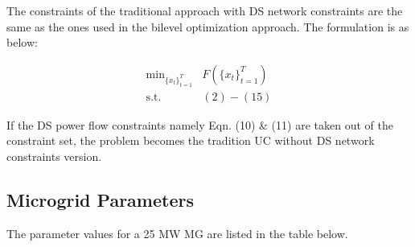 The constraints of the traditional approach with DS network constraints are the same as the ones used in the bilevel optimization approach. The formulation is as below:

\begin{subequations}
\begin{align}
\text{min}_{\{x_t\}^{T}_{t=1}} & F\left(\{x_t\}^{T}_{t=1}\right)\nonumber\\
\text{s.t.}  & (2) - (15)\nonumber
\end{align}
\end{subequations}

If the DS power flow constraints namely Eqn. (10) \& (11) are taken out of the constraint set, the problem becomes the tradition UC without DS network constraints version.


\subsection{Microgrid Parameters}
The parameter values for a 25 MW MG are listed in the table below.

